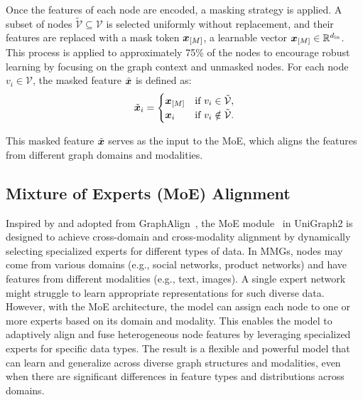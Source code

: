  Once the features of each node are encoded, a masking strategy is applied. A subset of nodes \( \tilde{\mathcal{V}} \subseteq \mathcal{V} \) is selected uniformly without replacement, and their features are replaced with a mask token \( {\bm{x}}_{[M]} \), a learnable vector \( {\bm{x}}_{[M]} \in \mathbb{R}^{d_{\text{in}}} \). This process is applied to approximately 75\% of the nodes to encourage robust learning by focusing on the graph context and unmasked nodes.
For each node \( v_i \in \mathcal{V} \), the masked feature \( \tilde{{\bm{x}}} \) is defined as:
\begin{equation}
    \tilde{{\bm{x}}}_i = 
\begin{cases}
{\bm{x}}_{[M]} & \text{if } v_i \in \tilde{\mathcal{V}}, \\
{\bm{x}}_i & \text{if } v_i \notin \tilde{\mathcal{V}}.
\end{cases}
\end{equation}

This masked feature \( \tilde{{\bm{x}}} \) serves as the input to the MoE, which aligns the features from different graph domains and modalities. 

\subsection{Mixture of Experts (MoE) Alignment}

Inspired by and adopted from GraphAlign~\cite{hou2024graphalign}, the MoE module~\cite{shazeer2017outrageously} in UniGraph2 is designed to achieve cross-domain and cross-modality alignment by dynamically selecting specialized experts for different types of data. 
In MMGs, nodes may come from various domains (e.g., social networks, product networks) and have features from different modalities (e.g., text, images). 
A single expert network might struggle to learn appropriate representations for such diverse data. However, with the MoE architecture, the model can assign each node to one or more experts based on its domain and modality. 
This enables the model to adaptively align and fuse heterogeneous node features by leveraging specialized experts for specific data types. 
The result is a flexible and powerful model that can learn and generalize across diverse graph structures and modalities, even when there are significant differences in feature types and distributions across domains.

